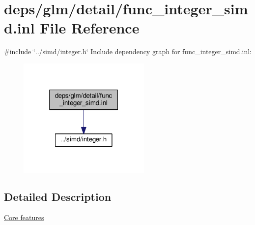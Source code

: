 \hypertarget{func__integer__simd_8inl}{}\section{deps/glm/detail/func\+\_\+integer\+\_\+simd.inl File Reference}
\label{func__integer__simd_8inl}
{\ttfamily \#include \char`\"{}../simd/integer.\+h\char`\"{}}\newline
Include dependency graph for func\+\_\+integer\+\_\+simd.\+inl\+:
\nopagebreak
\begin{figure}[H]
\begin{center}
\leavevmode
\includegraphics[width=184pt]{d1/dc4/func__integer__simd_8inl__incl}
\end{center}
\end{figure}


\subsection{Detailed Description}
\hyperlink{group__core}{Core features} 